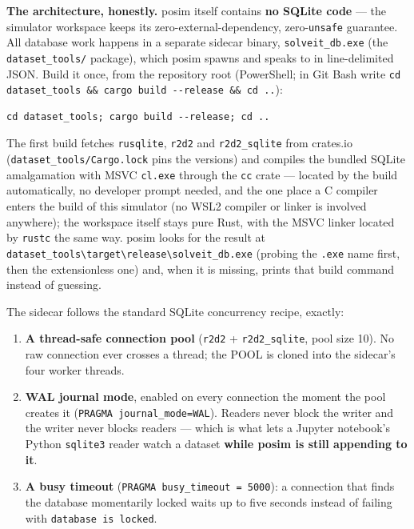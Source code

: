 \documentclass[11pt]{article}
\newcommand{\code}[1]{\texttt{#1}}
\begin{document}
\textbf{The architecture, honestly.} posim itself contains \textbf{no
SQLite code} --- the simulator workspace keeps its
zero-external-dependency, zero-\code{unsafe} guarantee. All database
work happens in a separate sidecar binary, \code{solveit\_db.exe} (the
\code{dataset\_tools/} package), which posim spawns and speaks to in
line-delimited JSON. Build it once, from the repository root
(PowerShell; in Git Bash write
\code{cd dataset\_tools \&\& cargo build -{}-release \&\& cd ..}):

\begin{lstlisting}
cd dataset_tools; cargo build --release; cd ..
\end{lstlisting}

The first build fetches \code{rusqlite}, \code{r2d2} and
\code{r2d2\_sqlite} from crates.io (\code{dataset\_tools/Cargo.lock}
pins the versions) and compiles the bundled SQLite amalgamation with
MSVC \code{cl.exe} through the \code{cc} crate --- located by the build
automatically, no developer prompt needed, and the one place a C
compiler enters the build of this simulator (no WSL2 compiler or
linker is involved anywhere); the workspace itself stays pure Rust,
with the MSVC linker located by \code{rustc} the same way. posim looks
for the result at
\code{dataset\_tools\textbackslash{}target\textbackslash{}release\textbackslash{}solveit\_db.exe}
(probing the \code{.exe} name first, then the extensionless one) and,
when it is missing, prints that build command instead of guessing.

The sidecar follows the standard SQLite concurrency recipe, exactly:

\begin{enumerate}
\item \textbf{A thread-safe connection pool} (\code{r2d2} +
      \code{r2d2\_sqlite}, pool size 10). No raw connection ever
      crosses a thread; the POOL is cloned into the sidecar's four
      worker threads.
\item \textbf{WAL journal mode}, enabled on every connection the
      moment the pool creates it (\code{PRAGMA journal\_mode=WAL}).
      Readers never block the writer and the writer never blocks
      readers --- which is what lets a Jupyter notebook's Python
      \code{sqlite3} reader watch a dataset \textbf{while posim is
      still appending to it}.
\item \textbf{A busy timeout} (\code{PRAGMA busy\_timeout = 5000}): a
      connection that finds the database momentarily locked waits up
      to five seconds instead of failing with
      \code{database is locked}.
\end{enumerate}
\end{document}
